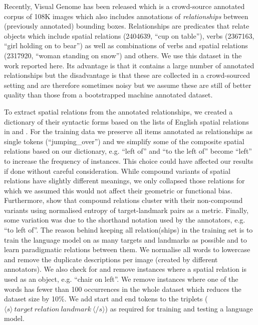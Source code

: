Recently, Visual Genome \cite{Krishna:2016aa} has been released which
is a crowd-source annotated corpus of 108K images which also includes
annotations of \emph{relationships} between (previously annotated)
bounding boxes. Relationships are predicates that relate objects which
include spatial relations (2404639, ``cup on table''), verbs (2367163,
``girl holding on to bear'') as well as combinations of verbs and
spatial relations (2317920, ``woman standing on snow'') and others.
We use this dataset in the work reported here. Its advantage is that
it contains a large number of annotated relationships but the
disadvantage is that these are collected in a crowd-sourced setting
and are therefore sometimes noisy but we assume these are still of better quality
than those from a bootstrapped machine annotated dataset.

To extract spatial relations from the annotated relationships, we
created a dictionary of their syntactic forms based on the lists
of English spatial relations in \citet{Landau:1996aa} and %
\citet{herskovits1986language}. %
For the training data we preserve all items annotated as relationships as single tokens (``jumping\_over'')
and we simplify some of the composite spatial relations based on our dictionary, e.g. ``left of''
and ``to the left of'' become ``left'' %
to increase the frequency of instances. This choice could have affected our results if done without careful consideration. While compound variants of spatial relations have slightly different meanings, we only collapsed those relations for which we assumed this would not affect their geometric or functional bias. Furthermore, \citet{Dobnik:2013aa} show that compound relations cluster with their non-compound variants using normalised entropy of target-landmark pairs as a metric. Finally, some variation was due to the shorthand notation used by the annotators, e.g. ``to left of''.  The reason behind keeping all relation(ships) in the training set is to train the language model on as many targets and landmarks as possible and to learn paradigmatic relations between them. We normalise
all words to lowercase and remove the duplicate descriptions per image
(created by different annotators). We also check for and remove instances %
where a spatial relation is used as an object, e.g.
``chair on left''.
We remove instances where
one of the words has fewer than 100 occurrences in the whole dataset which reduces
the dataset size by 10\%.
We add start and end tokens to the triplets ($\langle s \rangle\ target\ relation\ landmark\ \langle /s \rangle$) as required for training and testing a language model.
